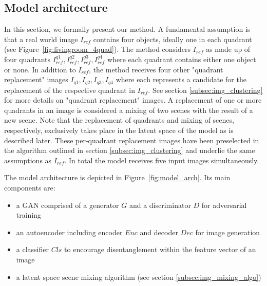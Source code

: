 \documentclass[12pt,a4paper]{article}
\begin{document}
\subsection{Model architecture}\label{subsec:model_arch}
In this section, we formally present our method. A fundamental assumption is that a real world image $I_{ref}$ contains four objects, ideally one in each quadrant (see Figure~\ref{fig:livingroom_4quad}). The method considers $I_{ref}$ as made up of four quadrants $I^{q1}_{ref}, I^{q2}_{ref}, I^{q3}_{ref}, I^{q4}_{ref}$ where each quadrant contains either one object or none. In addition to $I_{ref}$, the method receives four other "quadrant replacement" images $I_{q1},I_{q2},I_{q3},I_{q4}$ where each represents a candidate for the replacement of the respective quadrant in $I_{ref}$. See section \ref{subsec:img_clustering} for more details on "quadrant replacement" images. A replacement of one or more quadrants in an image is considered a mixing of two scenes with the result of a new scene. Note that the replacement of quadrants and mixing of scenes, respectively, exclusively takes place in the latent space of the model as is described later. These per-quadrant replacement images have been preselected in the algorithm outlined in section \ref{subsec:img_clustering} and underlie the same assumptions as $I_{ref}$. In total the model receives five input images simultaneously.

The model architecture is depicted in Figure~\ref{fig:model_arch}. Its main components are:

\begin{itemize}
   \item a GAN comprised of a generator $G$ and a discriminator $D$ for adversarial training
   \item an autoencoder including encoder $Enc$ and decoder $Dec$ for image generation
   \item a classifier $Cls$ to encourage disentanglement within the feature vector of an image
   \item a latent space scene mixing algorithm (see section \ref{subsec:img_mixing_algo})
\end{itemize}
 
\end{document}
